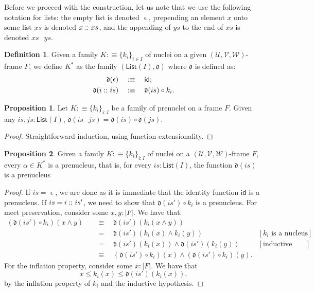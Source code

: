 \documentclass[a4paper, 11pt]{article}
\theoremstyle{definition}
\newtheorem{prop}{Proposition}
\newtheorem{defn}{Definition}
\DeclareMathOperator{\emptyl}{\epsilon}
\DeclareMathOperator{\cons}{\colon\kern-1.1ex\colon\kern-0.4ex}
\DeclareMathOperator{\append}{\,}
\newcommand{\UU}{\mathcal{U}}
\newcommand{\VV}{\mathcal{V}}
\newcommand{\WW}{\mathcal{W}}
\newcommand{\dd}[1]{\mathfrak{d}(#1)}
\newcommand{\define}[1]{\emph{#1}}
\begin{document}
Before we proceed with the construction, let us note that we use the following notation for lists:
the empty list is denoted $\emptyl$, prepending an element $x$ onto some list $xs$ is denoted $x
\cons xs$, and the appending of $ys$ to the end of $xs$ is denoted $xs \append ys$.

\begin{defn}
  Given a family $K :\equiv \{ k_i \}_{i \in I}$ of nuclei on a given $(\UU, \VV, \WW)$-frame $F$, we
  define \define{$K^*$} as the family $(\mathsf{List}(I), \mathfrak{d})$ where $\mathfrak{d}$ is
  defined as:
  \begin{align*}
    \dd{\emptyl}    \quad&:\equiv\quad \mathsf{id};  \\
    \dd{i \cons is} \quad&:\equiv\quad \dd{is} \circ k_i.
  \end{align*}
\end{defn}

\begin{prop}\label{prop:app-lemma}
  Let $K :\equiv \{ k_i \}_{i : I}$ be a family of prenuclei on a frame $F$. Given
  any $is, js : \mathsf{List}(I)$,
  \(
    \dd{is \append js} = \dd{is} \circ \dd{js}.
  \)
\end{prop}
\begin{proof}
  Straightforward induction, using function extensionality.
\end{proof}

\begin{prop}\label{prop:star-prenucleus}
  Given a family $K :\equiv \{ k_i \}_{i : I}$ of nuclei on a $(\UU, \VV, \WW)$-frame $F$, every $\alpha \in
  K^*$ is a prenucleus, that is, for every $is : \mathsf{List}(I)$, the function $\dd{is}$
  is a prenucleus
\end{prop}
\begin{proof}
  If $is = \emptyl$, we are done as it is immediate that the identity function $\mathsf{id}$ is a
  prenucleus. If $is = i \cons is'$, we need to show that $\dd{is'} \circ k_i$ is a prenucleus. For meet
  preservation, consider some $x, y : | F |$. We have that:
  \begin{align*}
    (\dd{is'} \circ k_i)(x \wedge y)
      &\quad\equiv\quad \dd{is'}(k_i(x \wedge y))                                                       \\
      &\quad=\quad \dd{is'}(k_i(x) \wedge k_i(y))                  & [\text{$k_i$ is a nucleus}]   \\
      &\quad=\quad \dd{is'}(k_i(x)) \wedge \dd{is'}(k_i(y))        & [\text{inductive hypothesis}] \\
      &\quad\equiv\quad (\dd{is'} \circ k_i)(x) \wedge (\dd{is'} \circ k_i)(y).
  \end{align*}
  For the inflation property, consider some $x : | F |$. We have that
  \begin{equation*}
    x \le k_i(x) \le \dd{is'}(k_i(x)),
  \end{equation*}
  by the inflation property of $k_i$ and the inductive hypothesis.
\end{proof}
\end{document}
